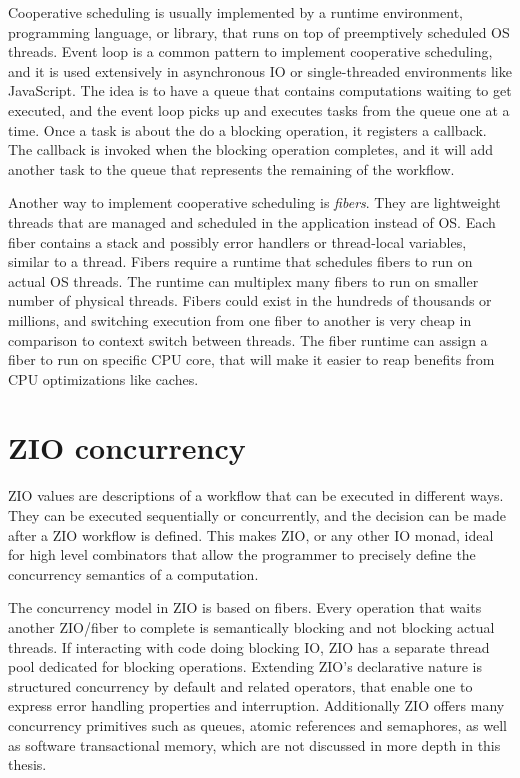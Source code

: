 Cooperative scheduling is usually implemented by a runtime environment, programming language, or library, that runs on top of preemptively scheduled OS threads. Event loop is a common pattern to implement cooperative scheduling, and it is used extensively in asynchronous IO or single-threaded environments like JavaScript. The idea is to have a queue that contains computations waiting to get executed, and the event loop picks up and executes tasks from the queue one at a time. Once a task is about the do a blocking operation, it registers a callback. The callback is invoked when the blocking operation completes, and it will add another task to the queue that represents the remaining of the workflow.

Another way to implement cooperative scheduling is \textit{fibers}. They are lightweight threads that are managed and scheduled in the application instead of OS. Each fiber contains a stack and possibly error handlers or thread-local variables, similar to a thread. Fibers require a runtime that schedules fibers to run on actual OS threads. The runtime can multiplex many fibers to run on smaller number of physical threads. Fibers could exist in the hundreds of thousands or millions, and switching execution from one fiber to another is very cheap in comparison to context switch between threads. The fiber runtime can assign a fiber to run on specific CPU core, that will make it easier to reap benefits from CPU optimizations like caches.


\section{ZIO concurrency}
ZIO values are descriptions of a workflow that can be executed in different ways. They can be executed sequentially or concurrently, and the decision can be made after a ZIO workflow is defined. This makes ZIO, or any other IO monad, ideal for high level combinators that allow the programmer to precisely define the concurrency semantics of a computation.

The concurrency model in ZIO is based on fibers. Every operation that waits another ZIO/fiber to complete is semantically blocking and not blocking actual threads. If interacting with code doing blocking IO, ZIO has a separate thread pool dedicated for blocking operations. Extending ZIO's declarative nature is structured concurrency by default and related operators, that enable one to express error handling properties and interruption. Additionally ZIO offers many concurrency primitives such as queues, atomic references and semaphores, as well as software transactional memory, which are not discussed in more depth in this thesis.

